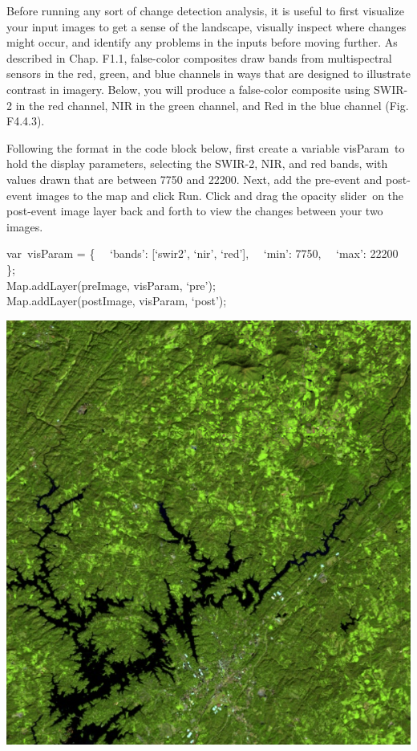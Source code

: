 \documentclass[
  letterpaper,
  DIV=11,
  numbers=noendperiod]{scrreprt}
\begin{document}
Before running any sort of change detection analysis, it is useful to
first visualize your input images to get a sense of the landscape,
visually inspect where changes might occur, and identify any problems in
the inputs before moving further. As described in Chap. F1.1,
false-color composites draw bands from multispectral sensors in the red,
green, and blue channels in ways that are designed to illustrate
contrast in imagery. Below, you will produce a false-color composite
using SWIR-2 in the red channel, NIR in the green channel, and Red in
the blue channel (Fig. F4.4.3).

Following the format in the code block below, first create a variable
visParam~to hold the display parameters, selecting the SWIR-2, NIR, and
red bands, with values drawn that are between 7750 and 22200. Next, add
the pre-event and post-event images to the map and click Run. Click and
drag the opacity slider~on the post-event image layer back and forth to
view the changes between your two images.

var~visParam = \{~ ~`bands': {[}`swir2', `nir', `red'{]},~ ~`min':
7750,~ ~`max': 22200\\
\};\\
Map.addLayer(preImage, visParam, `pre');\\
Map.addLayer(postImage, visParam, `post');

\includegraphics{./F4/image31.png}
\end{document}
